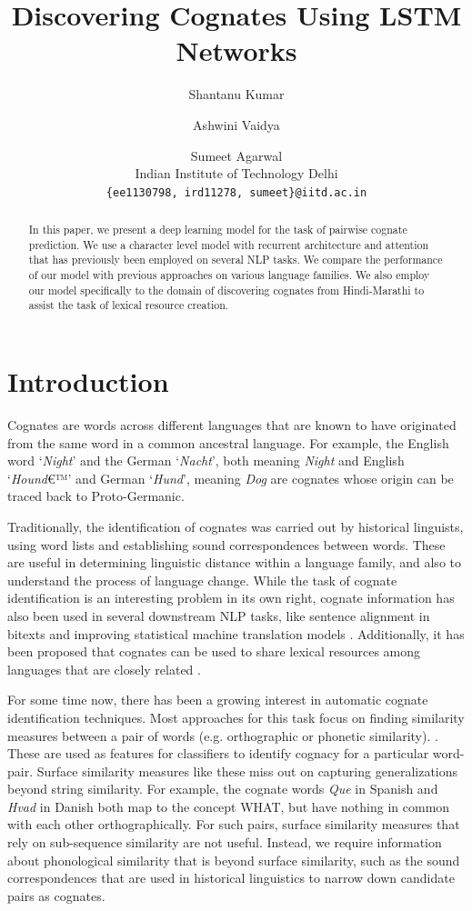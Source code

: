 \documentclass[11pt,letterpaper]{article}
\title{Discovering Cognates Using LSTM Networks}
\author{Shantanu Kumar \and Ashwini Vaidya \and Sumeet Agarwal \\ 
  Indian Institute of Technology Delhi
  \\ {\tt \{ee1130798, ird11278, sumeet\}@iitd.ac.in}}
\date{}
\begin{document}
\maketitle

\begin{abstract}
In this paper, we present a deep learning model for the task of pairwise cognate prediction. We use a character level model with recurrent architecture and attention that has previously been employed on several NLP tasks. We compare the performance of our model with previous approaches on various language families. We also employ our model specifically to the domain of discovering cognates from Hindi-Marathi to assist the task of lexical resource creation.
\end{abstract}

\section{Introduction}
Cognates are words across different languages that are known to have originated from the same word in a common ancestral language. For example, the English word `\textit{Night}' and the German `\textit{Nacht}', both meaning \textit{Night} and English `\textit{Hound}€™' and German `\textit{Hund}', meaning \textit{Dog} are cognates whose origin can be traced back to Proto-Germanic. 

Traditionally, the identification of cognates was carried out by historical linguists, using word lists and establishing sound correspondences between words. These are useful in determining linguistic distance within a language family, and also to understand the process of language change. While the task of cognate identification is an interesting problem in its own right, cognate information has also been used in several downstream NLP tasks, like sentence alignment in bitexts \cite{simard1993using} and improving statistical machine translation models \cite{kondrak2003cognates}. Additionally, it has been proposed that cognates can be used to share lexical resources among languages that are closely related \cite{Singh:07b}.

For some time now, there has been a growing interest in automatic cognate identification techniques. Most approaches for this task focus on finding similarity measures between a pair of words (e.g. orthographic or phonetic similarity). \cite{hauer2011clustering} \cite{inkpen2005similarity} \cite{List2016g}. These are used as features for classifiers to identify cognacy for a particular word-pair. Surface similarity measures like these miss out on capturing generalizations beyond string similarity. For example, the cognate words \textit{Que} in Spanish and \textit{Hvad} in Danish both map to the concept \textsc{WHAT}, but have nothing in common with each other orthographically. For such pairs, surface similarity measures that rely on sub-sequence similarity are not useful. Instead, we require information about phonological similarity that is beyond surface similarity, such as the sound correspondences that are used in historical linguistics to narrow down candidate pairs as cognates.
\end{document}
